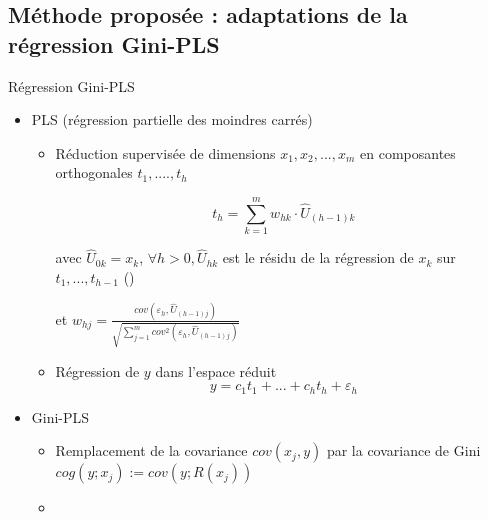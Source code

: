 \subsection{Méthode proposée : adaptations de la régression Gini-PLS}

\begin{frame}[t]{\mysubsectiontitle}
Régression	Gini-PLS
\begin{itemize}\small
	\item PLS \cite{wold1966pls} (régression partielle des moindres carrés) 
	\begin{itemize}\scriptsize
		\item Réduction supervisée de dimensions $x_1, x_2, ..., x_m$ en composantes orthogonales $t_1, ...., t_h$
		
		\[t_h = \sum_{k=1}^m w_{hk}\cdot \hat{U}_{(h-1)k}\] 
		
		avec $\hat{U}_{0k} = x_{k}$, $\forall h > 0, \hat{U}_{hk}$ est le résidu de la régression de $x_k$ sur $t_1, ..., t_{h-1}$ ()
		
		et $w_{hj} = \frac{cov(\varepsilon_h, \hat{U}_{(h-1)j})}{\sqrt{\sum_{j=1}^m cov^2(\varepsilon_h, \hat{U}_{(h-1)j})}}$
		\item Régression de $y$ dans l'espace réduit
		\[y=c_1 t_1 + ... + c_h t_h + \varepsilon_h\]			
	\end{itemize}
	\item Gini-PLS  \cite{mussard2018ginipls}
	\begin{itemize} \scriptsize
		\item Remplacement de la covariance $cov(x_j, y)$ par la covariance de Gini $cog(y; x_j) := cov(y; R(x_j))$
		\item 
	\end{itemize}	 	
	
\end{itemize} 
\end{frame}

